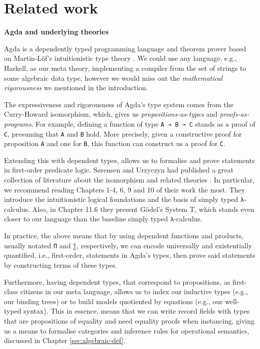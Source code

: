 \chapter{Related work}
\label{ch:relatedwork}

\noindent\textbf{Agda and underlying theories}

Agda \cite{agda} is a dependently typed programming language and theorem prover based on Martin-Löf's intuitionistic type theory \cite{martin1984intuitionistic}. We could use any language, e.g., Haskell, as our meta theory, implementing a compiler from the set of strings to some algebraic data type, however we would miss out the \textit{mathematical rigorousness} we mentioned in the introduction.

The expressiveness and rigorousness of Agda's type system comes from the Curry-Howard isomorphism, which, gives us \textit{propositions-as-types} and \textit{proofs-as-programs}. For example, defining a function of type \verb$A → B → C$ stands as a proof of \verb$C$, presuming that \verb$A$ and \verb$B$ hold. More precisely, given a constructive proof for proposition \verb$A$ and one for \verb$B$, this function can construct us a proof for \verb$C$.

Extending this with dependent types, allows us to formalise and prove statements in first-order predicate logic. S{\o}rensen and Urzyczyn had published a great collection of literature about the isomorphism and related theories \cite{sorensen1998curry}. In particular, we recommend reading Chapters 1-4, 6, 9 and 10 of their work the most. They introduce the intuitionistic logical foundations and the basis of simply typed \verb$λ$-calculus. Also, in Chapter 11.6 they present Gödel's System T, which stands even closer to our language than the baseline simply typed \verb$λ$-calculus.

In practice, the above means that by using dependent functions and products, usually notated \verb$Π$ and \verb$∑$, respectively, we can encode universally and existentially quantified, i.e., first-order, statements in Agda's types, then prove said statements by constructing terms of these types.

Furthermore, having dependent types, that correspond to propositions, as first-class citizens in our meta language, allows us to index our inductive types (e.g., our binding trees) or to build models quotiented by equations (e.g., our well-typed syntax). This in essence, means that we can write record fields with types that are propositions of equality and need equality proofs when instancing, giving us a means to formalise categories and inference rules for operational semantics, discussed in Chapter \ref{sec:algebraic-def}.


